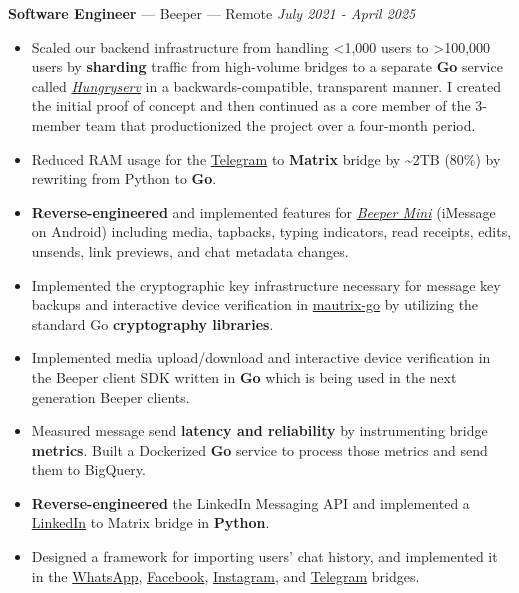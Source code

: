 \documentclass[10pt,letterpaper]{article}
\begin{document}
{\fontsize{11}{0}
\textbf{Software Engineer} --- Beeper --- Remote}
\hfill \textit{July 2021 - April 2025}
\begin{itemize}
    \item Scaled our backend infrastructure from handling \textless 1,000 users
        to \textgreater 100,000 users by \textbf{sharding} traffic from
        high-volume bridges to a separate \textbf{Go} service called
        \href{https://github.com/sumnerevans/hungryserv-presentation}{\textit{Hungryserv}}
        in a backwards-compatible, transparent manner. I created the initial
        proof of concept and then continued as a core member of the 3-member
        team that productionized the project over a four-month period.
    \item Reduced RAM usage for the
        \href{https://github.com/mautrix/telegramgo}{Telegram} to
        \textbf{Matrix} bridge by {\textasciitilde}2TB (80\%) by rewriting from
        Python to \textbf{Go}.
    \item \textbf{Reverse-engineered} and implemented features for
        \href{https://blog.beeper.com/p/introducing-beeper-mini-get-blue}{\textit{Beeper Mini}}
        (iMessage on Android) including media, tapbacks, typing indicators, read
        receipts, edits, unsends, link previews, and chat metadata changes.
    \item Implemented the cryptographic key infrastructure necessary for message
        key backups and interactive device verification in
        \href{https://github.com/mautrix/go}{mautrix-go} by utilizing the
        standard Go \textbf{cryptography libraries}.
    \item Implemented media upload/download and interactive device verification
        in the Beeper client SDK written in \textbf{Go} which is being used in
        the next generation Beeper clients.
    \item Measured message send \textbf{latency and reliability} by
        instrumenting bridge \textbf{metrics}. Built a Dockerized \textbf{Go}
        service to process those metrics and send them to BigQuery.
    \item \textbf{Reverse-engineered} the LinkedIn Messaging API and implemented a
        \href{https://github.com/beeper/linkedin}{LinkedIn} to Matrix bridge in
        \textbf{Python}.
    \item Designed a framework for importing users' chat history, and
        implemented it in the
        \href{https://github.com/mautrix/whatsapp}{WhatsApp},
        \href{https://github.com/mautrix/facebook}{Facebook},
        \href{https://github.com/mautrix/instagram}{Instagram}, and
        \href{https://github.com/mautrix/telegramgo}{Telegram} bridges.
\end{itemize}
\end{document}
